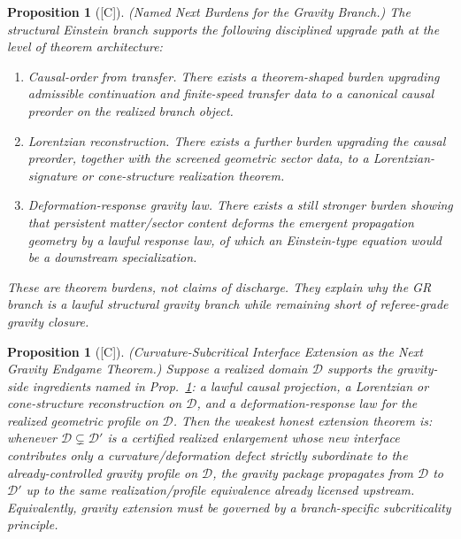 \documentclass[12pt,oneside]{amsbook}
\theoremstyle{plain}
\newtheorem{proposition}[theorem]{Proposition}
\theoremstyle{definition}
\theoremstyle{remark}
\newcommand{\status}[1]{\textup{[#1]}}
\begin{document}
\begin{proposition}[\status{C}]\label{prop:gr-next-burdens}
\textup{(Named Next Burdens for the Gravity Branch.)}
The structural Einstein branch supports the following disciplined
upgrade path at the level of theorem architecture:
\begin{enumerate}[label=\textup{(\arabic*)}]
 \item \emph{Causal-order from transfer.} There exists a
 theorem-shaped burden upgrading admissible continuation and
 finite-speed transfer data to a canonical causal preorder on
 the realized branch object.
 \item \emph{Lorentzian reconstruction.} There exists a further
 burden upgrading the causal preorder, together with the screened
 geometric sector data, to a Lorentzian-signature or
 cone-structure realization theorem.
 \item \emph{Deformation-response gravity law.} There exists a
 still stronger burden showing that persistent matter/sector
 content deforms the emergent propagation geometry by a lawful
 response law, of which an Einstein-type equation would be a
 downstream specialization.
\end{enumerate}
These are theorem burdens, not claims of discharge. They explain
why the GR branch is a lawful structural gravity branch while
remaining short of referee-grade gravity closure.
\end{proposition}

\begin{proposition}[\status{C}]\label{prop:gr-subcrit-extension}
\textup{(Curvature-Subcritical Interface Extension as the Next
Gravity Endgame Theorem.)}
Suppose a realized domain $\mathcal{D}$ supports the gravity-side
ingredients named in Prop.~\ref{prop:gr-next-burdens}: a lawful
causal projection, a Lorentzian or cone-structure reconstruction on
$\mathcal{D}$, and a deformation-response law for the realized
geometric profile on $\mathcal{D}$. Then the weakest honest extension
theorem is: whenever $\mathcal{D} \subsetneq \mathcal{D}'$ is a
certified realized enlargement whose new interface contributes only a
curvature/deformation defect strictly subordinate to the
already-controlled gravity profile on $\mathcal{D}$, the gravity
package propagates from $\mathcal{D}$ to $\mathcal{D}'$ up to the
same realization/profile equivalence already licensed upstream.
Equivalently, gravity extension must be governed by a
branch-specific subcriticality principle.
\end{proposition}
\end{document}
